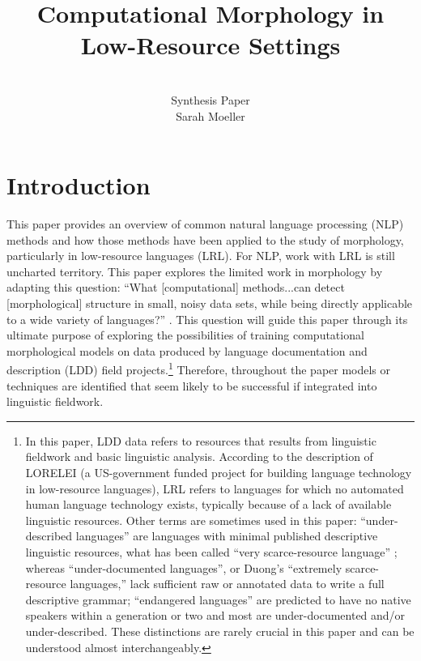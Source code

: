 \documentclass[12pt]{article}
\title{Computational Morphology in Low-Resource Settings}
\author{\\Synthesis Paper \\ Sarah Moeller}
\date{}
\begin{document}
\maketitle

\begin{singlespace}
\tableofcontents
\end{singlespace}

\pagebreak

\section{Introduction}
\label{sec:intro}

This paper provides an overview of common natural language processing (NLP) methods and how those methods have been applied to the study of morphology, particularly in low-resource languages (LRL). For NLP, work with LRL is still uncharted territory. This paper explores the limited work in morphology by adapting this question: ``What [computational] methods...can detect [morphological] structure in small, noisy data sets, while being directly applicable to a wide variety of languages?'' \cite{bird_natural_2009}. This question will guide this paper through its ultimate purpose of exploring the possibilities of training computational morphological models on data produced by language documentation and description (LDD) field projects.\footnote{In this paper, LDD data refers to resources that results from linguistic fieldwork and basic linguistic analysis. According to the description of LORELEI (a US-government funded project for building language technology in low-resource languages), LRL refers to languages for which no automated human language technology exists, typically because of a lack of available linguistic resources. Other terms are sometimes used in this paper: ``under-described languages'' are languages with minimal published descriptive linguistic resources, what has been called ``very scarce-resource language'' \cite{duong_natural_2017}; whereas ``under-documented languages'', or Duong's ``extremely scarce-resource languages,'' lack sufficient raw or annotated data to write a full descriptive grammar; ``endangered languages'' are predicted to have no native speakers within a generation or two and most are under-documented and/or under-described. These distinctions are rarely crucial in this paper and can be understood almost interchangeably.} Therefore, throughout the paper models or techniques are identified that seem likely to be successful if integrated into linguistic fieldwork.
\end{document}
